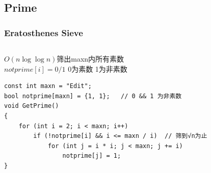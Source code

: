 \documentclass[twoside]{article}
\begin{document}
\subsection{Prime}
\subsubsection{Eratosthenes Sieve}
\begin{lstlisting}
\end{lstlisting}
$O(n\log\log n)$筛出maxn内所有素数\\
$notprime[i] = 0/1$ 0为素数 1为非素数\\
\begin{lstlisting}
const int maxn = "Edit";
bool notprime[maxn] = {1, 1};   // 0 && 1 为非素数
void GetPrime()
{
    for (int i = 2; i < maxn; i++)
        if (!notprime[i] && i <= maxn / i)  // 筛到√n为止
            for (int j = i * i; j < maxn; j += i)
                notprime[j] = 1;
}
\end{lstlisting}
\end{document}
